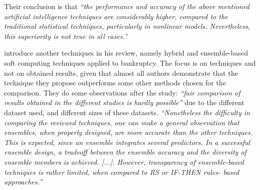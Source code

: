 Their conclusion is that \textit{``the performance and accuracy of the
  above mentioned artificial intelligence techniques are considerably
  higher, compared to the traditional statistical techniques,
  particularly in nonlinear models. Nevertheless, this superiority is
  not true in all cases.''}

\cite{verikas2010hybrid} introduce another techniques in his review,
namely hybrid and ensemble-based soft computing techniques applied to
bankruptcy. The focus is on techniques and not on obtained results,
given that almost all authors demonstrate that the technique they
propose outperforms some other methods chosen for the comparison. They
do some observations after the study: \textit{``fair comparison of
  results obtained in the different studies is hardly possible''} due
to the different dataset used, and different sizes of these datasets.
\textit{``Nonetheless the difficulty in comparing the reviewed
  techniques, one can make a general observation that ensembles, when
  properly designed, are more accurate than the other techniques. This
  is expected, since an ensemble integrates several predictors. In a
  successful ensemble design, a tradeoff between the ensemble accuracy
  and the diversity of ensemble members is achieved. [...]. However,
  transparency of ensemble-based techniques is rather limited, when
  compared to RS or IF-THEN rules- based approaches.''}


